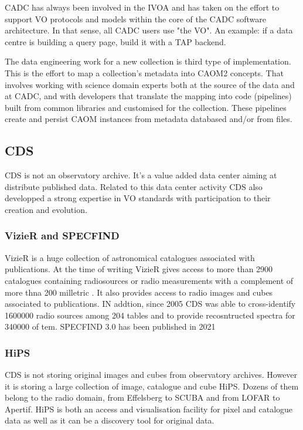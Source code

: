 \documentclass[11pt,a4paper]{ivoatex/ivoa}
\begin{document}
CADC has always been involved in the IVOA and has taken on the effort to support VO protocols and models 
within the core of the CADC software architecture. In that sense, all CADC users use "the VO".  An 
example: if a data centre is building a query page, build it with a TAP backend.

The data engineering work for a new collection is third type of implementation. This is the effort to 
map a collection's metadata into CAOM2 concepts. That involves working with science domain experts both 
at the source of the data and at CADC, and with developers that translate the mapping into code 
(pipelines) built from common libraries and customised for the collection. These pipelines create and 
persist CAOM instances from metadata databased and/or from files.

\subsection{CDS}
\label{sec:CDS}
CDS is not an observatory archive. It's a value added data center aiming at distribute published data. Related to this data center activity CDS also developped a strong expertise in VO standards with participation to their creation and evolution.  

\subsubsection{VizieR and SPECFIND}

VizieR is a huge collection of astronomical  catalogues associated with publications. At the time of writing VizieR gives access to more than 2900 catalogues containing radiosources or radio measurements with a complement of more thna 200 milletric . It also provides access to radio images and cubes associated to publications. IN addtion, since 2005 CDS was able to cross-identify 1600000 radio sources among 204 tables and to provide recosntructed spectra for 340000 of tem. SPECFIND 3.0 has been published in 2021 \citep{2020yCat.8104....0S}   


\subsubsection{HiPS}
CDS is not storing original images and cubes from observatory archives. However it is storing  a large collection of image, catalogue and cube HiPS. Dozens of them belong to the radio domain, from Effelsberg to SCUBA and from LOFAR to Apertif. HiPS is both an access and visualisation facility for pixel and catalogue data as well as it can be a discovery tool for original data. 
\end{document}
